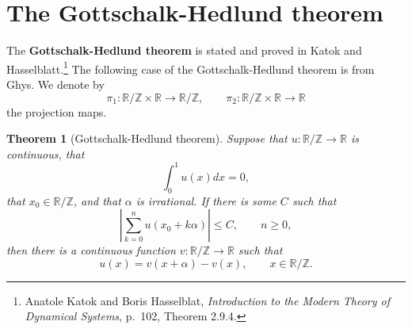 \documentclass{article}
\newtheorem{theorem}{Theorem}
\theoremstyle{definition}
\begin{document}
\section{The Gottschalk-Hedlund theorem}
The \textbf{Gottschalk-Hedlund theorem} is stated and proved in Katok and Hasselblatt.\footnote{Anatole Katok and Boris Hasselblat, {\em Introduction to the Modern Theory of Dynamical Systems},
p.~102, Theorem 2.9.4.} The following case of the Gottschalk-Hedlund theorem is from Ghys. We denote by
\[
\pi_1:\mathbb{R}/\mathbb{Z} \times \mathbb{R} \to 
\mathbb{R} / \mathbb{Z}, \qquad \pi_2:\mathbb{R}/\mathbb{Z} \times \mathbb{R} \to 
\mathbb{R} 
\]
 the projection maps. 

\begin{theorem}[Gottschalk-Hedlund theorem]
Suppose that $u:\mathbb{R}/\mathbb{Z} \to \mathbb{R}$ is continuous, that 
\[
\int_0^1 u(x) dx =0,
\]
that $x_0 \in \mathbb{R} / \mathbb{Z}$, and that $\alpha$ is irrational. If there is some $C$ such that
\begin{equation}
\left| \sum_{k=0}^n u(x_0+k\alpha) \right| \leq C, \qquad n \geq 0,
\label{Cinequality}
\end{equation}
then there is  a continuous function  $v:\mathbb{R}/\mathbb{Z} \to \mathbb{R}$ such that
\[
u(x)=v(x+\alpha)-v(x), \qquad x \in \mathbb{R}/\mathbb{Z}.
\]
\end{theorem}
\end{document}
